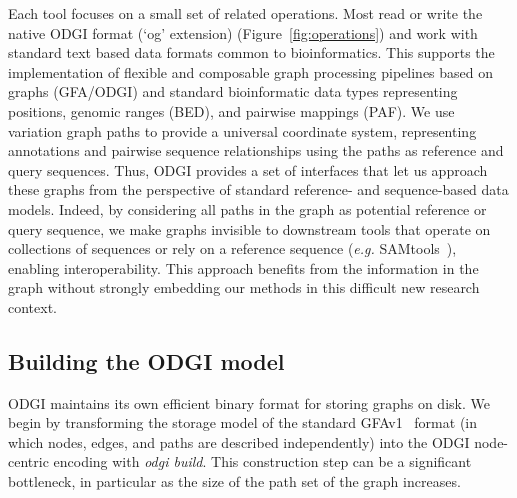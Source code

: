 \documentclass{bioinfo}
\begin{document}
Each tool focuses on a small set of related operations.
Most read or write the native ODGI format (`og' extension) (Figure~\ref{fig:operations}) and work with standard text based data formats common to bioinformatics.
This supports the implementation of flexible and composable graph processing pipelines based on graphs (GFA/ODGI) and standard bioinformatic data types representing positions, genomic ranges (BED), and pairwise mappings (PAF).
We use variation graph paths to provide a universal coordinate system, representing annotations and pairwise sequence relationships using the paths as reference and query sequences.
Thus, ODGI provides a set of interfaces that let us approach these graphs from the perspective of standard reference- and sequence-based data models.
Indeed, by considering all paths in the graph as potential reference or query sequence, we make graphs invisible to downstream tools that operate on collections of sequences or rely on a reference sequence (\textit{e.g.} SAMtools~\citep{Li2009}), enabling interoperability.
This approach benefits from the information in the graph without strongly embedding our methods in this difficult new research context.




\subsection{Building the \textsc{ODGI} model}
\label{sec:build}
ODGI maintains its own efficient binary format for storing graphs on disk.
We begin by transforming the storage model of the standard GFAv1~\citep{GFA} format (in which nodes, edges, and paths are described independently) into the ODGI node-centric encoding with \textit{odgi build}.
This construction step can be a significant bottleneck, in particular as the size of the path set of the graph increases.
\end{document}
